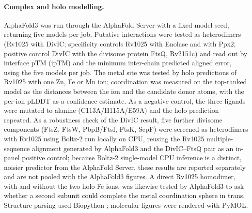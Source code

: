 \documentclass[11pt,a4paper]{article}
\begin{document}
\paragraph{Complex and holo modelling.} AlphaFold3 \citep{abramson2024alphafold3} was run through the AlphaFold Server with a fixed model seed, returning five models per job. Putative interactions were tested as heterodimers (Rv1025 with DivIC; specificity controls Rv1025 with Enolase and with Ppx2; positive control DivIC with the divisome protein FtsQ, Rv2151c) and read out by interface pTM (ipTM) and the minimum inter-chain predicted aligned error, using the five models per job. The metal site was tested by holo predictions of Rv1025 with one Zn, Fe or Mn ion; coordination was measured on the top-ranked model as the distances between the ion and the candidate donor atoms, with the per-ion pLDDT as a confidence estimate. As a negative control, the three ligands were mutated to alanine (C113A/H115A/E59A) and the holo prediction repeated. As a robustness check of the DivIC result, five further divisome components (FtsZ, FtsW, PbpB/FtsI, FtsK, SepF) were screened as heterodimers with Rv1025 using Boltz-2 \citep{passaro2025boltz2} run locally on CPU, reusing the Rv1025 multiple-sequence alignment generated by AlphaFold3 and the DivIC--FtsQ pair as an in-panel positive control; because Boltz-2 single-model CPU inference is a distinct, noisier predictor from the AlphaFold Server, these results are reported separately and are not pooled with the AlphaFold3 figures. A direct Rv1025 homodimer, with and without the two holo Fe ions, was likewise tested by AlphaFold3 to ask whether a second subunit could complete the metal coordination sphere in trans. Structure parsing used Biopython \citep{cock2009biopython}; molecular figures were rendered with PyMOL.
\end{document}
